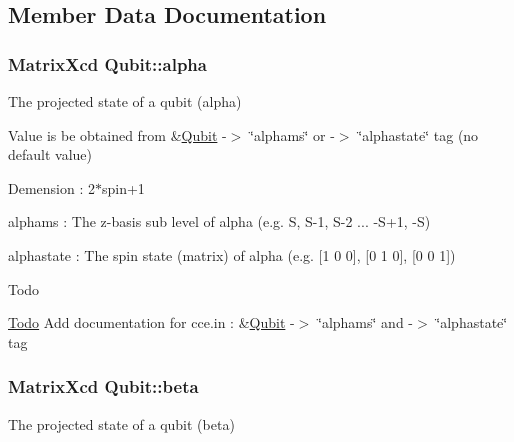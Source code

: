 \subsection{Member Data Documentation}
\hypertarget{structQubit_accc3b309d802ab6f269b7d8a7536a4a0}{
\subsubsection[{alpha}]{\setlength{\rightskip}{0pt plus 5cm}Matrix\-Xcd Qubit\-::alpha}}\label{structQubit_accc3b309d802ab6f269b7d8a7536a4a0}


The projected state of a qubit (alpha) 

Value is be obtained from \&\hyperlink{structQubit}{Qubit} -\/$>$ \char`\"{}alphams\char`\"{} or -\/$>$ \char`\"{}alphastate\char`\"{} tag (no default value)
\begin{DoxyItemize}
\item Demension \-: 2$\ast$spin+1
\item alphams \-: The z-\/basis sub level of alpha (e.\-g. S, S-\/1, S-\/2 ... -\/\-S+1, -\/\-S)
\item alphastate \-: The spin state (matrix) of alpha (e.\-g. \mbox{[}1 0 0\mbox{]}, \mbox{[}0 1 0\mbox{]}, \mbox{[}0 0 1\mbox{]}) \begin{DoxyRefDesc}{Todo}
\item[\hyperlink{todo__todo000021}{Todo}]Add documentation for cce.\-in \-: \&\hyperlink{structQubit}{Qubit} -\/$>$ \char`\"{}alphams\char`\"{} and -\/$>$ \char`\"{}alphastate\char`\"{} tag \end{DoxyRefDesc}

\end{DoxyItemize}\hypertarget{structQubit_a6c73eb8c49fdb6db06179b21b5a2923d}{
\subsubsection[{beta}]{\setlength{\rightskip}{0pt plus 5cm}Matrix\-Xcd Qubit\-::beta}}\label{structQubit_a6c73eb8c49fdb6db06179b21b5a2923d}


The projected state of a qubit (beta) 

